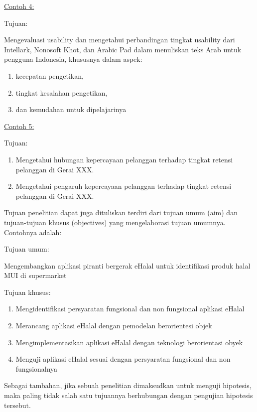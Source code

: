 \noindent\underline{Contoh 4:}

\noindent Tujuan:

Mengevaluasi usability dan mengetahui perbandingan tingkat usability dari Intellark, Nonosoft Khot, dan Arabic Pad dalam menuliskan teks Arab untuk pengguna Indonesia, khususnya dalam aspek:
\begin{enumerate}
  \item kecepatan pengetikan,
  \item tingkat kesalahan pengetikan,
  \item dan kemudahan untuk dipelajarinya  
\end{enumerate}

\noindent\underline{Contoh 5:}

\noindent Tujuan:
\begin{enumerate}
  \item Mengetahui hubungan kepercayaan pelanggan terhadap tingkat retensi pelanggan di Gerai XXX.
  \item Mengetahui pengaruh kepercayaan pelanggan terhadap tingkat retensi pelanggan di Gerai XXX.
\end{enumerate}

Tujuan penelitian dapat juga dituliskan terdiri dari tujuan umum (aim) dan tujuan-tujuan khusus (objectives) yang mengelaborasi tujuan umumnya. Contohnya adalah:

\begin{displayquote}
  Tujuan umum:

  Mengembangkan aplikasi piranti bergerak eHalal untuk identifikasi produk halal MUI di supermarket 
  
  Tujuan khusus:
  \begin{enumerate}
    \item Mengidentifikasi persyaratan fungsional dan non fungsional aplikasi eHalal
    \item Merancang aplikasi eHalal dengan pemodelan berorientesi objek
    \item Mengimplementasikan aplikasi eHalal dengan teknologi berorientasi obyek
    \item Menguji aplikasi eHalal sesuai dengan persyaratan fungsional dan non fungsionalnya 
  \end{enumerate}
\end{displayquote}
  
Sebagai tambahan, jika sebuah penelitian dimaksudkan untuk menguji hipotesis, maka paling tidak salah satu tujuannya berhubungan dengan pengujian hipotesis tersebut.


